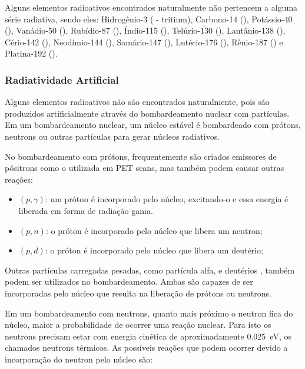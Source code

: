 \documentclass[11pt,a4paper]{article}
\begin{document}
                Alguns elementos radioativos encontrados naturalmente não pertencem a alguma série radiativa, sendo eles: Hidrogênio-3 ( - tritium),  Carbono-14 (), Potássio-40 (), Vanádio-50 (), Rubídio-87 (), Índio-115 (), Telúrio-130 (), Lantânio-138 (), Cério-142 (), Neodímio-144 (), Samário-147 (), Lutécio-176 (), Rênio-187 () e Platina-192 ().
            
            \subsubsection{Radiatividade Artificial}

                Alguns elementos radioativos não são encontrados naturalmente, pois são produzidos artificialmente através do bombardeamento nuclear com partículas. Em um bombardeamento nuclear, um núcleo estável é bombardeado com prótons, neutrons ou outras partículas para gerar núcleos radiativos.

                No bombardeamento com prótons, frequentemente são criados emissores de pósitrons como o  utilizada em PET scans, mas também podem causar outras reações:

                    \begin{itemize}
                        \item $(p, \gamma)$: um próton é incorporado pelo núcleo, excitando-o e essa energia é liberada em forma de radiação gama.
                        \item $(p, n)$: o próton é incorporado pelo núcleo que libera um neutron;
                        \item $(p, d)$: o próton é incorporado pelo núcleo que libera um deutério;
                    \end{itemize}

                Outras partículas carregadas pesadas, como partícula alfa, e deutérios , também podem ser utilizados no bombardeamento. Ambas são capazes de ser incorporadas pelo núcleo que resulta na  liberação de prótons ou neutrons.

                Em um bombardeamento com neutrons, quanto mais próximo o neutron fica do núcleo, maior a probabilidade de ocorrer uma reação nuclear. Para isto os neutrons precisam estar com energia cinética de aproximadamente \qty{0.025}{eV}, os chamados neutrons térmicos. As possíveis reações que podem ocorrer devido a incorporação do neutron pelo núcleo são:
\end{document}

